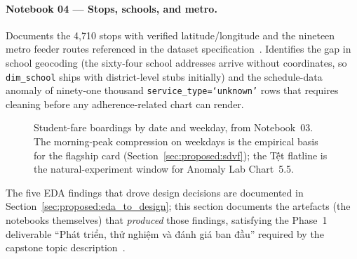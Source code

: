 \paragraph{Notebook 04 --- Stops, schools, and metro.}
Documents the 4{,}710 stops with verified latitude/longitude
and the nineteen metro feeder routes referenced in the dataset
specification~\cite{hcmcgps2025}. Identifies the gap in school
geocoding (the sixty-four school addresses arrive without
coordinates, so \texttt{dim\_school} ships with district-level
stubs initially) and the schedule-data anomaly of ninety-one
thousand \texttt{service\_type=`unknown'} rows that requires
cleaning before any adherence-related chart can render.

\begin{figure}[H]
\centering
{}
\caption{Student-fare boardings by date and weekday, from
Notebook~03. The morning-peak compression on weekdays is the
empirical basis for the flagship card
(Section~\ref{sec:proposed:sdvf}); the T\d ết flatline is the
natural-experiment window for Anomaly Lab Chart~5.5.}
\label{fig:prototype:eda_student_fare}
\end{figure}

The five EDA findings that drove design decisions are documented
in Section~\ref{sec:proposed:eda_to_design}; this section
documents the artefacts (the notebooks themselves) that
\emph{produced} those findings, satisfying the Phase~1
deliverable ``Phát triển, thử nghiệm và đánh giá ban đầu''
required by the capstone topic description~\cite{capstoneDescription}.
